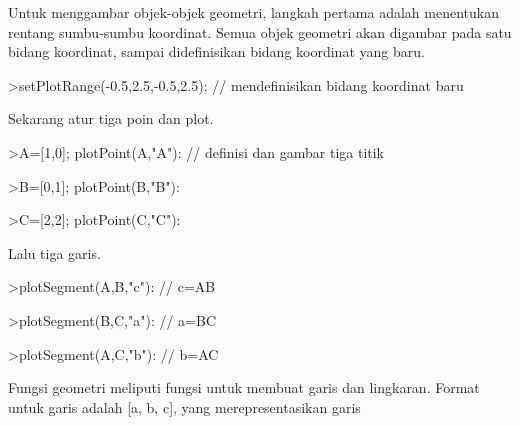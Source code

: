 \documentclass[12pt,arial,letterpaper]{book}
\begin{document}
\begin{eulernootebook}
\begin{eulercomment}
\begin{eulercomment}
\begin{eulernootebook}
\begin{eulercomment}
\begin{eulercomment}
\begin{eulercomment}
\begin{eulercomment}
\begin{eulercomment}
\begin{eulercomment}
\begin{eulernotebook}
\begin{eulercomment}
\begin{eulercomment}
\begin{eulercomment}
\end{eulercomment}
\begin{eulercomment}
Untuk menggambar objek-objek geometri, langkah pertama adalah menentukan rentang sumbu-sumbu
koordinat. Semua objek geometri akan digambar pada satu bidang koordinat, sampai didefinisikan
bidang koordinat yang baru.
\end{eulercomment}
\begin{eulerprompt}
>setPlotRange(-0.5,2.5,-0.5,2.5); // mendefinisikan bidang koordinat baru 
\end{eulerprompt}
\begin{eulercomment}
Sekarang atur tiga poin dan plot.
\end{eulercomment}
\begin{eulerprompt}
>A=[1,0]; plotPoint(A,"A"): // definisi dan gambar tiga titik
\end{eulerprompt}
\begin{eulerprompt}
>B=[0,1]; plotPoint(B,"B"):
\end{eulerprompt}
\begin{eulerprompt}
>C=[2,2]; plotPoint(C,"C"):
\end{eulerprompt}
\begin{eulercomment}
Lalu tiga garis.
\end{eulercomment}
\begin{eulerprompt}
>plotSegment(A,B,"c"): // c=AB
\end{eulerprompt}
\begin{eulerprompt}
>plotSegment(B,C,"a"): // a=BC
\end{eulerprompt}
\begin{eulerprompt}
>plotSegment(A,C,"b"): // b=AC
\end{eulerprompt}
\begin{eulercomment}
Fungsi geometri meliputi fungsi untuk membuat garis dan lingkaran.
Format untuk garis adalah [a, b, c], yang merepresentasikan garis

\end{eulercomment}
\end{eulercomment}
\end{eulercomment}
\end{eulernotebook}
\end{eulercomment}
\end{eulercomment}
\end{eulercomment}
\end{eulercomment}
\end{eulercomment}
\end{eulercomment}
\end{eulernootebook}
\end{eulercomment}
\end{eulercomment}
\end{eulernootebook}
\end{document}
